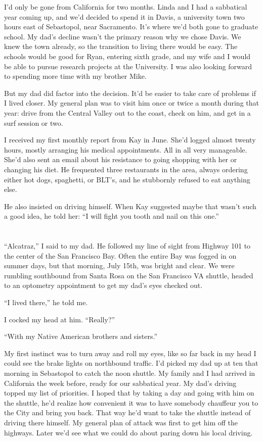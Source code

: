 \documentclass[12pt]{book}
\begin{document}
I'd only be gone from California for two months. Linda and I had a sabbatical year coming up, and we'd decided to spend it in Davis, a university town two hours east of Sebastopol, near Sacramento. It's where we'd both gone to graduate school. My dad's decline wasn't the primary reason why we chose Davis. We knew the town already, so the transition to living there would be easy. The schools would be good for Ryan, entering sixth grade, and my wife and I would be able to pursue research projects at the University. I was also looking forward to spending more time with my brother Mike.

But my dad did factor into the decision. It'd be easier to take care of problems if I lived closer. My general plan was to visit him once or twice a month during that year: drive from the Central Valley out to the coast, check on him, and get in a surf session or two.

I received my first monthly report from Kay in June. She'd logged almost twenty hours, mostly arranging his medical appointments. All in all very manageable. She'd also sent an email about his resistance to going shopping with her or changing his diet. He frequented three restaurants in the area, always ordering either hot dogs, spaghetti, or BLT's, and he stubbornly refused to eat anything else.

He also insisted on driving himself. When Kay suggested maybe that wasn't such a good idea, he told her: ``I will fight you tooth and nail on this one.''


\chapter{}

``Alcatraz,'' I said to my dad. He followed my line of sight from Highway 101 to the center of the San Francisco Bay. Often the entire Bay was fogged in on summer days, but that morning, July 15th, was bright and clear. We were rumbling southbound from Santa Rosa on the San Francisco VA shuttle, headed to an optometry appointment to get my dad's eyes checked out.

``I lived there,'' he told me.

I cocked my head at him. ``Really?''

``With my Native American brothers and sisters.''

My first instinct was to turn away and roll my eyes, like so far back in my head I could see the brake lights on northbound traffic. I'd picked my dad up at ten that morning in Sebastopol to catch the noon shuttle. My family and I had arrived in California the week before, ready for our sabbatical year. My dad's driving topped my list of priorities. I hoped that by taking a day and going with him on the shuttle, he'd realize how convenient it was to have somebody chauffeur you to the City and bring you back. That way he'd want to take the shuttle instead of driving there himself. My general plan of attack was first to get him off the highways. Later we'd see what we could do about paring down his local driving.
\end{document}
